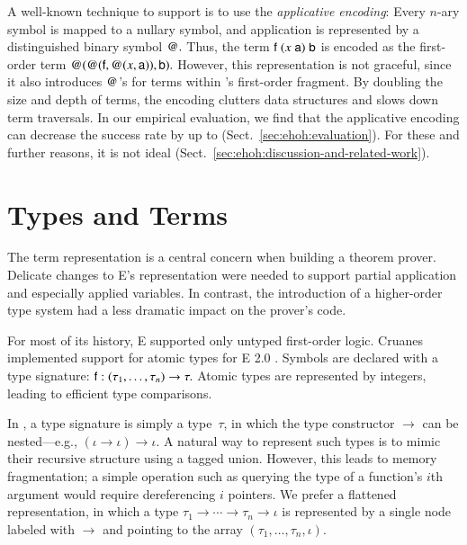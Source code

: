 A well-known technique to support \lfhol{} %
is to use the \emph{applicative encoding}:
Every $n$-ary symbol is mapped to a nullary symbol, and
application is represented by a distinguished binary symbol $\mathsf{@}.$ Thus,
the \lfhol{} term $\mathsf{f} \; (x\; \mathsf{a}) \; \mathsf{b}$ is
encoded as the first-order term $\mathsf{@}(\mathsf{@}(\mathsf{f}, \mathsf{@}(x,
\mathsf{a})), \mathsf{b}).$ However, this representation is not graceful, since it
also introduces $\mathsf{@}$'s for terms within \lfhol's first-order fragment. By
doubling the size and depth of terms, the encoding clutters data
structures and slows down term traversals.
In our empirical evaluation, we find that the applicative encoding can
decrease the success rate by up to  (Sect.~\ref{sec:ehoh:evaluation}).
For these and further reasons, it
is not ideal (Sect.~\ref{sec:ehoh:discussion-and-related-work}).



\section{Types and Terms}
\label{sec:ehoh:types-and-terms}

The term representation is a central concern when building a theorem
prover. Delicate changes to E's representation were needed to support
partial application and especially applied variables. In contrast, the
introduction of a higher-order type system had a less dramatic impact on the
prover's code.

 For most of its history, E supported only untyped first-order logic. Cruanes
implemented support for atomic types for E 2.0
\cite[p.\,117]{sc-15-simon-phd}. Symbols are declared
with a type signature:
$\mathsf{f} : (\tau_1, \ldots, \tau_{n}) \rightarrow \tau.$
Atomic types are represented by integers, leading to efficient type comparisons.

In \lfhol{}, a type signature is simply a type~$\tau$, in which the
type constructor $\to$ can be nested---e.g., $(\iota \to \iota)\allowbreak
\to \iota.$
%
A natural way to represent such types is to mimic their recursive
structure using a tagged union. However, this leads to memory fragmentation;
a simple operation such as querying the type of a function's $i$th
argument would require dereferencing $i$ pointers. We prefer a
flattened representation, in
which a type $\tau_1 \rightarrow \cdots \rightarrow \tau_n \rightarrow \iota$
is represented by a single node labeled with ${\rightarrow}$ and pointing to
the array $(\tau_1,\dots,\tau_n,\iota).$

